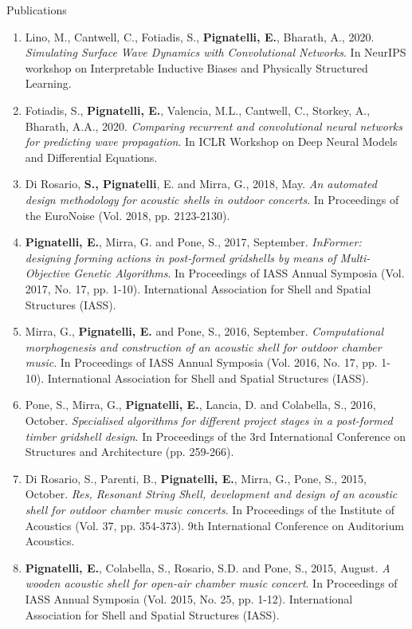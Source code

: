 \documentclass{resume}
\begin{document}
\begin{rSection}{Publications}
    \begin{enumerate}[leftmargin=0.45cm, itemsep=0em, topsep=0.5em, parsep=0.2em]
        \item Lino, M., Cantwell, C., Fotiadis, S., \textbf{Pignatelli, E.}, Bharath, A., 2020. \textit{Simulating Surface Wave Dynamics with Convolutional Networks}. In NeurIPS workshop on Interpretable Inductive Biases and Physically Structured Learning.
        \item Fotiadis, S., \textbf{Pignatelli, E.}, Valencia, M.L., Cantwell, C., Storkey, A., Bharath, A.A., 2020. \textit{Comparing recurrent and convolutional neural networks for predicting wave propagation}. In ICLR Workshop on Deep Neural Models and Differential Equations.	
        \item Di Rosario, \textbf{S., Pignatelli}, E. and Mirra, G., 2018, May. \textit{An automated design methodology for acoustic shells in outdoor concerts}. In Proceedings of the EuroNoise (Vol. 2018, pp. 2123-2130).
        \item \textbf{Pignatelli, E.}, Mirra, G. and Pone, S., 2017, September. \textit{InFormer: designing forming actions in post-formed gridshells by means of Multi-Objective Genetic Algorithms}. In Proceedings of IASS Annual Symposia (Vol. 2017, No. 17, pp. 1-10). International Association for Shell and Spatial Structures (IASS).
        \item Mirra, G., \textbf{Pignatelli, E.} and Pone, S., 2016, September. \textit{Computational morphogenesis and construction of an acoustic shell for outdoor chamber music}. In Proceedings of IASS Annual Symposia (Vol. 2016, No. 17, pp. 1-10). International Association for Shell and Spatial Structures (IASS).
        \item Pone, S., Mirra, G., \textbf{Pignatelli, E.}, Lancia, D. and Colabella, S., 2016, October. \textit{Specialised algorithms for different project stages in a post-formed timber gridshell design}. In Proceedings of the 3rd International Conference on Structures and Architecture (pp. 259-266).
        \item Di Rosario, S., Parenti, B., \textbf{Pignatelli, E.}, Mirra, G., Pone, S., 2015, October. \textit{Res, Resonant String Shell, development and design of an acoustic shell for outdoor chamber music concerts}. In Proceedings of the Institute of Acoustics (Vol. 37, pp. 354-373). 9th International Conference on Auditorium Acoustics.
        \item \textbf{Pignatelli, E.}, Colabella, S., Rosario, S.D. and Pone, S., 2015, August. \textit{A wooden acoustic shell for open-air chamber music concert}. In Proceedings of IASS Annual Symposia (Vol. 2015, No. 25, pp. 1-12). International Association for Shell and Spatial Structures (IASS).
    \end{enumerate}
    \end{rSection}
    
\end{document}
